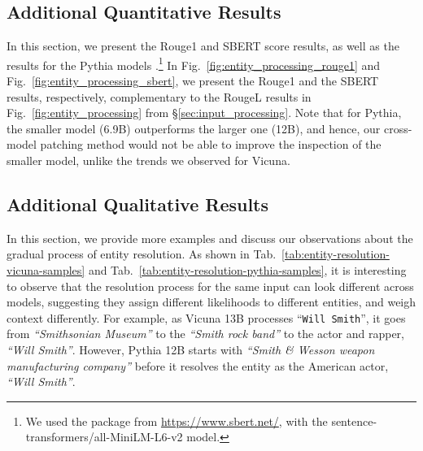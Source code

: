 \documentclass{article}
\theoremstyle{plain}
\theoremstyle{definition}
\theoremstyle{remark}
\begin{document}
\subsection{Additional Quantitative Results}
\label{sec:appendix-entity-resolution}

In this section, we present the Rouge1 \cite{lin-2004-rouge} and SBERT score \citep{reimers-2019-sentence-bert} results, as well as the results for the Pythia models \citep{pythia}.\footnote{We used the package from \url{https://www.sbert.net/}, with the sentence-transformers/all-MiniLM-L6-v2 model.} In Fig.~\ref{fig:entity_processing_rouge1} and Fig.~\ref{fig:entity_processing_sbert}, we present the Rouge1 and the SBERT results, respectively, complementary to the RougeL results in Fig.~\ref{fig:entity_processing} from \S\ref{sec:input_processing}.  Note that for Pythia, the smaller model (6.9B) outperforms the larger one (12B), and hence, our cross-model patching method would not be able to improve the inspection of the smaller model, unlike the trends we observed for Vicuna. 


\subsection{Additional Qualitative Results}
\label{sec:appendix-entity-resolution-qualitative}

In this section, we provide more examples and discuss our observations about the gradual process of entity resolution. As shown in Tab.~\ref{tab:entity-resolution-vicuna-samples} and Tab.~\ref{tab:entity-resolution-pythia-samples}, it is interesting to observe that the resolution process for the same input can look different across models, suggesting they assign different likelihoods to different entities, and weigh context differently. For example, as Vicuna 13B processes ``\texttt{Will Smith}'', it goes from \textit{``Smithsonian Museum''} to the \textit{``Smith rock band''} to the actor and rapper, \textit{``Will Smith''}. However, Pythia 12B starts with \textit{``Smith \& Wesson weapon manufacturing company''} before it resolves the entity as the American actor, \textit{``Will Smith''}. 
\end{document}
